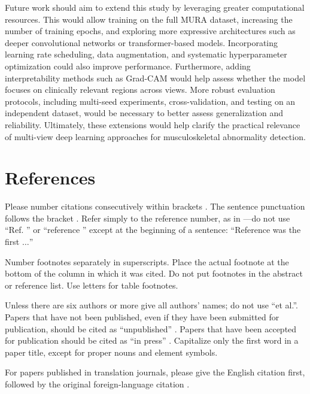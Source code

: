 \documentclass[conference]{IEEEtran}
\begin{document}
Future work should aim to extend this study by leveraging greater computational resources. This would allow training on the full MURA dataset, increasing the number of training epochs, and exploring more expressive architectures such as deeper convolutional networks or transformer-based models. Incorporating learning rate scheduling, data augmentation, and systematic hyperparameter optimization could also improve performance. Furthermore, adding interpretability methods such as Grad-CAM would help assess whether the model focuses on clinically relevant regions across views. More robust evaluation protocols, including multi-seed experiments, cross-validation, and testing on an independent dataset, would be necessary to better assess generalization and reliability. Ultimately, these extensions would help clarify the practical relevance of multi-view deep learning approaches for musculoskeletal abnormality detection.



\section*{References}

Please number citations consecutively within brackets \cite{b1}. The 
sentence punctuation follows the bracket \cite{b2}. Refer simply to the reference 
number, as in \cite{b3}---do not use ``Ref. \cite{b3}'' or ``reference \cite{b3}'' except at 
the beginning of a sentence: ``Reference \cite{b3} was the first $\ldots$''

Number footnotes separately in superscripts. Place the actual footnote at 
the bottom of the column in which it was cited. Do not put footnotes in the 
abstract or reference list. Use letters for table footnotes.

Unless there are six authors or more give all authors' names; do not use 
``et al.''. Papers that have not been published, even if they have been 
submitted for publication, should be cited as ``unpublished'' \cite{b4}. Papers 
that have been accepted for publication should be cited as ``in press'' \cite{b5}. 
Capitalize only the first word in a paper title, except for proper nouns and 
element symbols.

For papers published in translation journals, please give the English 
citation first, followed by the original foreign-language citation \cite{b6}.
\end{document}
